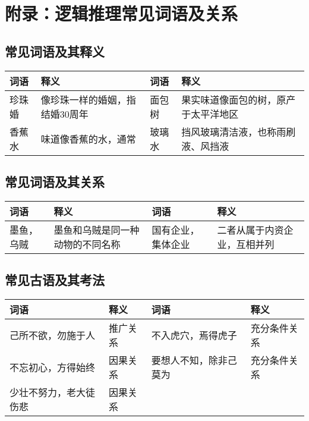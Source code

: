 \section{附录：逻辑推理常见词语及关系}
\label{trd:appendix}

\subsection{常见词语及其释义}

\begin{longtable}{|p{}|p{}|p{}|p{}|}
    \hline
    \textbf{词语} & \textbf{释义}      & \textbf{词语} & \textbf{释义}        \\
    \hline
    珍珠婚         & 像珍珠一样的婚姻，指结婚30周年 & 面包树         & 果实味道像面包的树，原产于太平洋地区 \\
    \hline
    香蕉水         & 味道像香蕉的水，通常       & 玻璃水         & 挡风玻璃清洁液，也称雨刷液、风挡液  \\

\end{longtable}

\subsection{常见词语及其关系}

\begin{longtable}{|p{}|p{}|p{}|p{}|}
    \hline
    \textbf{词语} & \textbf{释义}      & \textbf{词语} & \textbf{释义}    \\
    \hline
    墨鱼，乌贼       & 墨鱼和乌贼是同一种动物的不同名称 & 国有企业，集体企业   & 二者从属于内资企业，互相并列 \\
    \hline
\end{longtable}

\subsection{常见古语及其考法}

\begin{longtable}{|p{}|p{}|p{}|p{}|}
    \hline
    \textbf{词语} & \textbf{释义} & \textbf{词语} & \textbf{释义} \\
    \hline
    己所不欲，勿施于人   & 推广关系        & 不入虎穴，焉得虎子   & 充分条件关系      \\
    \hline
    不忘初心，方得始终   & 因果关系        & 要想人不知，除非己莫为 & 充分条件关系      \\
    \hline
    少壮不努力，老大徒伤悲 & 因果关系        &             &             \\
    \hline

\end{longtable}